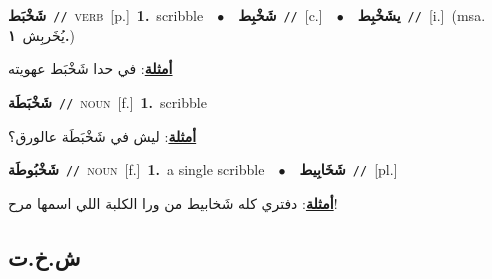 \documentclass[10pt,a4paper,twoside]{article} %
\begin{document}
\begin{multicols}{2}
{\setlength\topsep{0pt}\textbf{\foreignlanguage{arabic}{شَخْبَط}}\ {\color{gray}\texttt{//}\color{black}}\ \textsc{verb}\ [p.]\ \textbf{1.}~scribble\ \ $\bullet$\ \ \setlength\topsep{0pt}\textbf{\foreignlanguage{arabic}{شَخْبِط}}\ {\color{gray}\texttt{//}\color{black}}\ [c.]\ \ $\bullet$\ \ \setlength\topsep{0pt}\textbf{\foreignlanguage{arabic}{يشَخْبِط}}\ {\color{gray}\texttt{//}\color{black}}\ [i.]\ \color{gray}(msa. \foreignlanguage{arabic}{يُخَربِش}~\foreignlanguage{arabic}{\textbf{١.}})\color{black}\  \begin{flushright}\color{gray}\foreignlanguage{arabic}{\textbf{\underline{\foreignlanguage{arabic}{أمثلة}}}: في حدا شَخْبَط عهويته}\end{flushright}\color{black}} \vspace{2mm}

{\setlength\topsep{0pt}\textbf{\foreignlanguage{arabic}{شَخْبَطَة}}\ {\color{gray}\texttt{//}\color{black}}\ \textsc{noun}\ [f.]\ \textbf{1.}~scribble\  \begin{flushright}\color{gray}\foreignlanguage{arabic}{\textbf{\underline{\foreignlanguage{arabic}{أمثلة}}}: ليش في شَخْبَطَة عالورق؟}\end{flushright}\color{black}} \vspace{2mm}

{\setlength\topsep{0pt}\textbf{\foreignlanguage{arabic}{شَخْبُوطَة}}\ {\color{gray}\texttt{//}\color{black}}\ \textsc{noun}\ [f.]\ \textbf{1.}~a single scribble\ \ $\bullet$\ \ \setlength\topsep{0pt}\textbf{\foreignlanguage{arabic}{شَخَابِيط}}\ {\color{gray}\texttt{//}\color{black}}\ [pl.]\  \begin{flushright}\color{gray}\foreignlanguage{arabic}{\textbf{\underline{\foreignlanguage{arabic}{أمثلة}}}: دفتري كله شَخابيط من ورا الكلبة اللي اسمها مرح!}\end{flushright}\color{black}} \vspace{2mm}

\vspace{-3mm}
\subsection*{\color{blue}\foreignlanguage{arabic}{ش.خ.ت}\color{blue}{}} 


\end{multicols}
\end{document}
